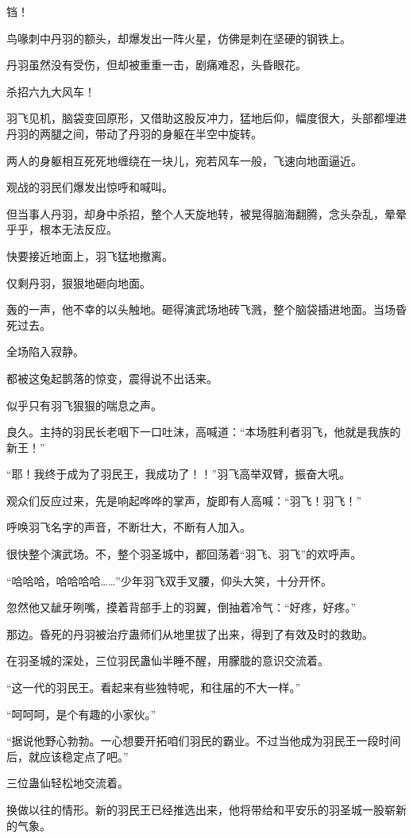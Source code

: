 \begin{this_body}
铛！

鸟喙刺中丹羽的额头，却爆发出一阵火星，仿佛是刺在坚硬的钢铁上。

丹羽虽然没有受伤，但却被重重一击，剧痛难忍，头昏眼花。

杀招六九大风车！

羽飞见机，脑袋变回原形，又借助这股反冲力，猛地后仰，幅度很大，头部都埋进丹羽的两腿之间，带动了丹羽的身躯在半空中旋转。

两人的身躯相互死死地缠绕在一块儿，宛若风车一般，飞速向地面逼近。

观战的羽民们爆发出惊呼和喊叫。

但当事人丹羽，却身中杀招，整个人天旋地转，被晃得脑海翻腾，念头杂乱，晕晕乎乎，根本无法反应。

快要接近地面上，羽飞猛地撤离。

仅剩丹羽，狠狠地砸向地面。

轰的一声，他不幸的以头触地。砸得演武场地砖飞溅，整个脑袋插进地面。当场昏死过去。

全场陷入寂静。

都被这兔起鹊落的惊变，震得说不出话来。

似乎只有羽飞狠狠的喘息之声。

良久。主持的羽民长老咽下一口吐沫，高喊道：“本场胜利者羽飞，他就是我族的新王！”

“耶！我终于成为了羽民王，我成功了！！”羽飞高举双臂，振奋大吼。

观众们反应过来，先是响起哗哗的掌声，旋即有人高喊：“羽飞！羽飞！”

呼唤羽飞名字的声音，不断壮大，不断有人加入。

很快整个演武场。不，整个羽圣城中，都回荡着“羽飞、羽飞”的欢呼声。

“哈哈哈，哈哈哈哈……”少年羽飞双手叉腰，仰头大笑，十分开怀。

忽然他又龇牙咧嘴，摸着背部手上的羽翼，倒抽着冷气：“好疼，好疼。”

那边。昏死的丹羽被治疗蛊师们从地里拔了出来，得到了有效及时的救助。

在羽圣城的深处，三位羽民蛊仙半睡不醒，用朦胧的意识交流着。

“这一代的羽民王。看起来有些独特呢，和往届的不大一样。”

“呵呵呵，是个有趣的小家伙。”

“据说他野心勃勃。一心想要开拓咱们羽民的霸业。不过当他成为羽民王一段时间后，就应该稳定点了吧。”

三位蛊仙轻松地交流着。

换做以往的情形。新的羽民王已经推选出来，他将带给和平安乐的羽圣城一股崭新的气象。


\end{this_body}
